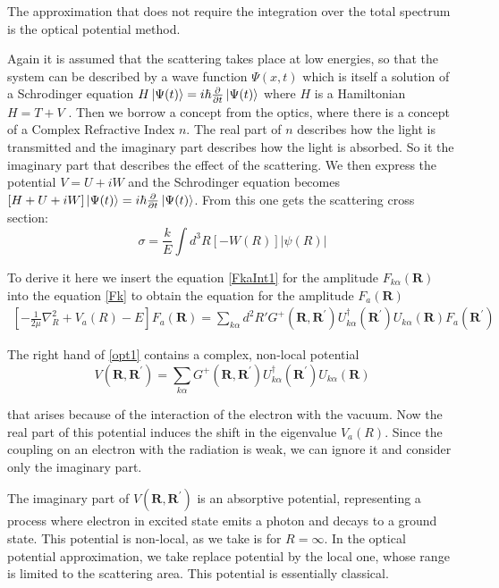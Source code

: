 The approximation that does not require the integration over the total spectrum is the optical potential method. 

Again it is assumed that the scattering takes place at low energies, so that the system can be described by a wave function $ \Psi(x,t) $ which is itself a solution of a Schrodinger equation $ H\ket{\Psi(t)} = i\hbar\frac{\partial}{\partial t}\ket{\Psi(t)} $ where $ H $ is a Hamiltonian $ H = T + V $ .
Then we borrow a concept from the optics, where there is a concept of a Complex Refractive Index $ n $. The real part of $ n $ describes how the light is transmitted and the imaginary part describes how the light is absorbed. So it the imaginary part that describes the effect of the scattering. We then express the potential $ V = U + iW $  and the Schrodinger equation becomes $ \left[H + U + iW\right]\ket{\Psi(t)} = i\hbar\frac{\partial}{\partial t}\ket{\Psi(t)} $. From this one gets the scattering cross section:
\begin{equation}
\sigma = \frac{k}{E}\int{d^3R\left[-W(R)\right]\left| \psi(R) \right|}
\end{equation}

To derive it here we insert the equation \eqref{FkaInt1} for the amplitude $ F_{k\alpha}(\mathbf{R}) $ into the equation \eqref{Fk} to obtain the equation for the amplitude $ F_a(\mathbf{R}) $
\begin{equation}\label{opt1}
\begin{split}
\left[-\frac{1}{2\mu}\nabla_R^2 + V_a(R) - E \right]F_a(\mathbf{R}) = \sum_{k\alpha}{d^2R'G^{+}(\mathbf{R},\mathbf{R}^{'})U_{k\alpha}^{\dagger}(\mathbf{R}^{'})U_{k\alpha}(\mathbf{R})F_a(\mathbf{R}^{'})}
\end{split}
\end{equation}

The right hand of \eqref{opt1} contains a complex, non-local potential
\begin{equation}\label{optV1}
V(\mathbf{R},\mathbf{R}^{'}) = \sum_{k\alpha}{G^{+}(\mathbf{R},\mathbf{R}^{'})U_{k\alpha}^{\dagger}(\mathbf{R}^{'})U_{k\alpha}(\mathbf{R}) }
\end{equation}

that arises because of the interaction of the electron with the vacuum. Now the real part of this potential induces the shift in the eigenvalue $ V_a(R) $. Since the coupling on an electron with the radiation is weak, we can ignore it and consider only the imaginary part. 

The imaginary part of $ V(\mathbf{R},\mathbf{R}^{'}) $ is an absorptive potential, representing a process where electron in excited state emits a photon and decays to a ground state. This potential is non-local, as we take is for $ R = \infty $. In the optical potential approximation, we take replace potential by the local one, whose range is limited to the scattering area. This potential is essentially classical.

